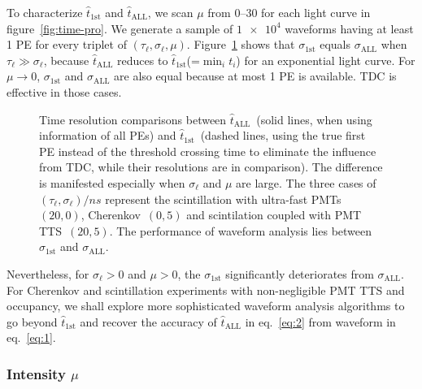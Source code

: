 To characterize $\hat{t}_\mathrm{1st}$ and $\hat{t}_\mathrm{ALL}$, we scan $\mu$ from \numrange{0}{30} for each light curve in figure~\ref{fig:time-pro}. We generate a sample of $\num[retain-unity-mantissa=false]{1e4}$ waveforms having at least 1 PE for every triplet of $(\tau_\ell, \sigma_\ell, \mu)$.  Figure~\ref{fig:reso-diff} shows that $\sigma_{\mathrm{1st}}$ equals $\sigma_{\mathrm{ALL}}$ when $\tau_\ell \gg \sigma_\ell$, because $\hat{t}_\mathrm{ALL}$ reduces to $\hat{t}_\mathrm{1st}$(=$\min_i t_i$) for an exponential light curve. For $\mu \to 0$, $\sigma_{\mathrm{1st}}$ and $\sigma_{\mathrm{ALL}}$ are also equal because at most 1 PE is available.  TDC is effective in those cases.

\begin{figure}[H]
  \centering
  \resizebox{0.8\textwidth}{!}{}
  \caption{\label{fig:reso-diff} Time resolution comparisons between $\hat{t}_{\mathrm{ALL}}$~(solid lines, when using information of all PEs) and $\hat{t}_\mathrm{1st}$~(dashed lines, using the true first PE instead of the threshold crossing time to eliminate the influence from TDC, while their resolutions are in comparison).  The difference is manifested especially when $\sigma_\ell$ and $\mu$ are large. The three cases of $(\tau_\ell, \sigma_\ell)/\si{ns}$ represent the scintillation with ultra-fast PMTs~$(20, 0)$, Cherenkov~$(0, 5)$ and scintilation coupled with PMT TTS~$(20, 5)$. The performance of waveform analysis lies between $\sigma_{\mathrm{1st}}$ and $\sigma_{\mathrm{ALL}}$. }
\end{figure}

Nevertheless, for $\sigma_\ell > 0$ and $\mu >0$, the $\sigma_{\mathrm{1st}}$ significantly deteriorates from $\sigma_{\mathrm{ALL}}$.  For Cherenkov and scintillation experiments with non-negligible PMT TTS and occupancy, we shall explore more sophisticated waveform analysis algorithms to go beyond $\hat{t}_{\mathrm{1st}}$ and recover the accuracy of $\hat{t}_\mathrm{ALL}$ in eq.~\eqref{eq:2} from waveform in eq.~\eqref{eq:1}.

\subsubsection{Intensity $\mu$}
\label{sec:intensity-mu}

